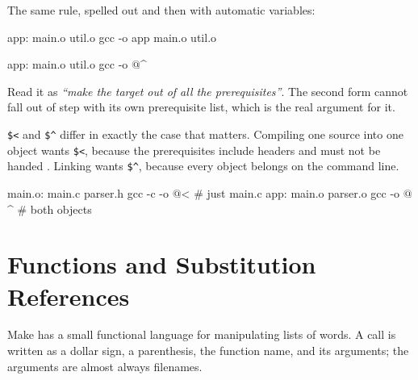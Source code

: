 \begin{eg}
	The same rule, spelled out and then with automatic variables:
\begin{makecode}
app: main.o util.o
    gcc -o app main.o util.o

app: main.o util.o
    gcc -o $@ $^
\end{makecode}
	Read it as \emph{``make the target out of all the prerequisites''}. The second
	form cannot fall out of step with its own prerequisite list, which is the real
	argument for it.
\end{eg}

\begin{note}
	\texttt{\$<} and \texttt{\$\textasciicircum{}} differ in exactly the case that
	matters. Compiling one source into one object wants \texttt{\$<}, because the
	prerequisites include headers and  must not be handed
	. Linking wants \texttt{\$\textasciicircum{}}, because every
	object belongs on the command line.
\begin{makecode}
main.o: main.c parser.h
    gcc -c -o $@ $<            # just main.c
app: main.o parser.o
    gcc -o $@ $^               # both objects
\end{makecode}
\end{note}

\section{Functions and Substitution References}\label{sec:mk-funcs}

Make has a small functional language for manipulating lists of words. A call is
written as a dollar sign, a parenthesis, the function name, and its arguments;
the arguments are almost always filenames.

